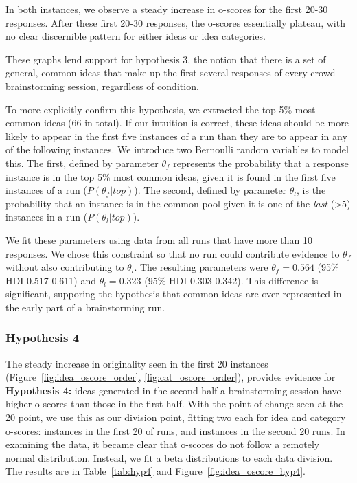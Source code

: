 In both instances, we observe a steady increase in o-scores for the first 20-30 responses. After these first 20-30 responses, the o-scores essentially plateau, with no clear discernible pattern for either ideas or idea categories.

These graphs lend support for hypothesis 3, the notion that there is a set of general, common ideas that make up the first several responses of every crowd brainstorming session, regardless of condition.

To more explicitly confirm this hypothesis, we extracted the top 5\% most common ideas (66 in total). If our intuition is correct, these ideas should be more likely to appear in the first five instances of a run than they are to appear in any of the following instances. We introduce two Bernoulli random variables to model this. The first, defined by parameter $\theta_f$ represents the probability that a response instance is in the top 5\% most common ideas, given it is found in the first five instances of a run ($P(\theta_f|top)$). The second, defined by parameter $\theta_l$, is the probability that an instance is in the common pool given it is one of the \emph{last} (>5) instances in a run ($P(\theta_l|top)$).

We fit these parameters using data from all runs that have more than 10 responses. We chose this constraint so that no run could contribute evidence to $\theta_f$ without also contributing to $\theta_l$. The resulting parameters were $\theta_f = 0.564$ (95\% HDI 0.517-0.611) and $\theta_l = 0.323$ (95\% HDI 0.303-0.342). This difference is significant, supporing the hypothesis that common ideas are over-represented in the early part of a brainstorming run.



\subsubsection{Hypothesis 4}
The steady increase in originality seen in the first 20 instances (Figure~\ref{fig:idea_oscore_order}, \ref{fig:cat_oscore_order}), provides evidence for \textbf{Hypothesis 4:} ideas generated in the second half a brainstorming session have higher o-scores than those in the first half.
With the point of change seen at the 20 point, we use this as our division point, fitting two each for idea and category o-scores: instances in the first 20 of runs, and instances in the second 20 runs.
In examining the data, it became clear that o-scores do not follow a remotely normal distribution. Instead, we fit a beta distributions to each data division. The results are in Table~\ref{tab:hyp4} and Figure~\ref{fig:idea_oscore_hyp4}.

